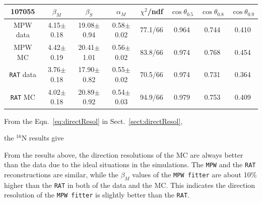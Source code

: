 \begin{table}[ht]
	\begin{tabular}{cccccccc}%
		\toprule
	107055& $\beta_M$ &  $\beta_S$ & $\alpha_M$ & $\chi^2$/ndf & $\cos\theta_{0.5}$ & $\cos\theta_{0.8}$& $\cos\theta_{0.9}$\\
	\hline
	MPW data & 4.15$\pm$0.18 & 19.08$\pm$0.94 & 0.58$\pm$0.02 & 77.1/66 & 0.964 & 0.744 & 0.410 \\
	MPW MC & 4.42$\pm$0.19 & 20.41$\pm$1.01 & 0.56$\pm$0.02 & 83.8/66 & 0.974 & 0.768 & 0.454	 \\	
\hline
	\texttt{RAT} data & 3.76$\pm$0.18 & 17.90$\pm$0.82 & 0.55$\pm$0.02 & 70.5/66 & 0.974 & 0.731 & 0.364 \\
	\texttt{RAT} MC & 4.02$\pm$0.18 & 20.89$\pm$0.92 & 0.54$\pm$0.03 & 94.9/66 & 0.979 & 0.753 & 0.409	\\
		\bottomrule
	\end{tabular}
	\label{angularResolValuesUpdated}
\end{table}

From the Eqn.~\ref{eq:directResol} in Sect.~\ref{sect:directResol}, 

the $^{16}$N results give
%
%

From the results above, the direction resolutions of the MC are always better than the data due to the ideal situations in the simulations. The \texttt{MPW} and the \texttt{RAT} reconstructions are similar, while the $\beta_M$ values of the \texttt{MPW fitter} are about 10\% higher than the \texttt{RAT} in both of the data and the MC. This indicates the direction resolution of the \texttt{MPW fitter} is slightly better than the \texttt{RAT}.

